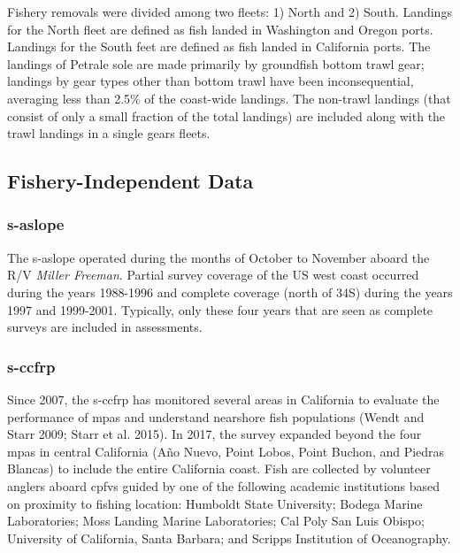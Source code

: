 \documentclass[11pt,
  english,
  letterpaper,
]{article}
\begin{document}
Fishery removals were divided among two fleets: 1) North and 2) South. Landings for the North fleet are defined as fish landed in Washington and Oregon ports. Landings for the South feet are defined as fish landed in California ports. The landings of Petrale sole are made primarily by groundfish bottom trawl gear; landings by gear types other than bottom trawl have been inconsequential, averaging less than 2.5\% of the coast-wide landings. The non-trawl landings (that consist of only a small fraction of the total landings) are included along with the trawl landings in a single gears fleets.

\hypertarget{fishery-independent-data}{%
\subsection{Fishery-Independent Data}\label{fishery-independent-data}}

\hypertarget{section}{%
\subsubsection{\texorpdfstring{\acrlong{s-aslope}}{}}\label{section}}

The \gls{s-aslope} operated during the months of October to November aboard the R/V \emph{Miller Freeman}. Partial survey coverage of the US west coast occurred during the years 1988-1996 and complete coverage (north of 34\textquotesingle S) during the years 1997 and 1999-2001. Typically, only these four years that are seen as complete surveys are included in assessments.

\hypertarget{section-1}{%
\subsubsection{\texorpdfstring{\acrlong{s-ccfrp}}{}}\label{section-1}}

Since 2007, the \gls{s-ccfrp} has monitored several areas in California to evaluate the performance of \glspl{mpa} and understand nearshore fish populations (Wendt and Starr 2009; Starr et al. 2015). In 2017, the survey expanded beyond the four \Gls{mpa}s in central California (Año Nuevo, Point Lobos, Point Buchon, and Piedras Blancas) to include the entire California coast. Fish are collected by volunteer anglers aboard \glspl{cpfv} guided by one of the following academic institutions based on proximity to fishing location: Humboldt State University; Bodega Marine Laboratories; Moss Landing Marine Laboratories; Cal Poly San Luis Obispo; University of California, Santa Barbara; and Scripps Institution of Oceanography.
\end{document}
